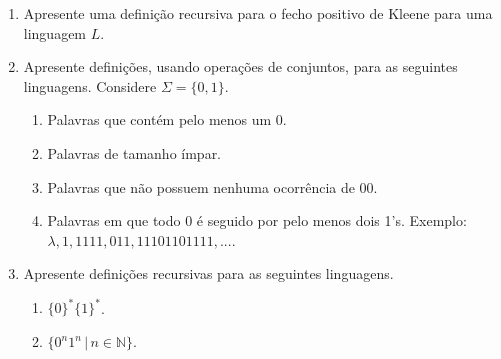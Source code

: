 \documentclass[a4paper]{article}
\theoremstyle{definition}
\begin{document}
  \begin{enumerate}
    \item Apresente uma definição recursiva para o fecho positivo de Kleene para
      uma linguagem $L$.
    \item Apresente definições, usando operações de conjuntos, para as seguintes
      linguagens. Considere $\Sigma = \{0,1\}$.
      \begin{enumerate}
         \item Palavras que contém pelo menos um 0.
         \item Palavras de tamanho ímpar.
         \item Palavras que não possuem nenhuma ocorrência de 00.
         \item Palavras em que todo 0 é seguido por pelo menos dois 1's.
           Exemplo: $\lambda, 1, 1111, 011, 11101101111,...$.
      \end{enumerate}
      \item Apresente definições recursivas para as seguintes linguagens.
      \begin{enumerate}
         \item $\{0\}^*\{1\}^*$.
         \item $\{0^n1^n\,|\,n\in\mathbb{N}\}$.
      \end{enumerate}
  \end{enumerate}
\end{document}
